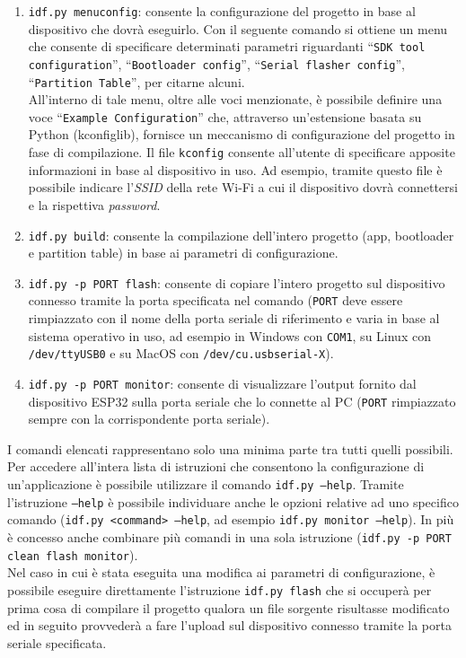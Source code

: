 \begin{enumerate}
    \item \texttt{idf.py menuconfig}: consente la configurazione del progetto in base al dispositivo che dovrà eseguirlo. Con il seguente comando si ottiene un menu che consente di specificare determinati parametri riguardanti ``\texttt{SDK tool configuration}'', ``\texttt{Bootloader config}'', ``\texttt{Serial flasher config}'', ``\texttt{Partition Table}'', per citarne alcuni. \\
    All'interno di tale menu, oltre alle voci menzionate, è possibile definire una voce ``\texttt{Example Configuration}'' che, attraverso un'estensione basata su Python (kconfiglib), fornisce un meccanismo di configurazione del progetto in fase di compilazione. Il file \texttt{kconfig} consente all'utente di specificare apposite informazioni in base al dispositivo in uso. Ad esempio, tramite questo file è possibile indicare l'\textit{SSID} della rete Wi-Fi a cui il dispositivo dovrà connettersi e la rispettiva \textit{password}.
    
    \item \texttt{idf.py build}: consente la compilazione dell'intero progetto (app, bootloader e partition table) in base ai parametri di configurazione. 
    
    \item \texttt{idf.py -p PORT flash}: consente di copiare l'intero progetto sul dispositivo connesso tramite la porta specificata nel comando (\texttt{PORT} deve essere rimpiazzato con il nome della porta seriale di riferimento e varia in base al sistema operativo in uso, ad esempio in Windows con \texttt{COM1}, su Linux con \texttt{/dev/ttyUSB0} e su MacOS con \texttt{/dev/cu.usbserial-X}).
    
    \item \texttt{idf.py -p PORT monitor}: consente di visualizzare l'output fornito dal dispositivo ESP32 sulla porta seriale che lo connette al PC (\texttt{PORT} rimpiazzato sempre con la corrispondente porta seriale).
\end{enumerate}

\noindent I comandi elencati rappresentano solo una minima parte tra tutti quelli possibili. Per accedere all'intera lista di istruzioni che consentono la configurazione di un'applicazione è possibile utilizzare il comando \texttt{idf.py ---help}. Tramite l'istruzione \texttt{--help} è possibile individuare anche le opzioni relative ad uno specifico comando (\texttt{idf.py <command> ---help}, ad esempio \texttt{idf.py monitor ---help}). In più è concesso anche combinare più comandi in una sola istruzione (\texttt{idf.py -p PORT clean flash monitor}).\\
Nel caso in cui è stata eseguita una modifica ai parametri di configurazione, è possibile eseguire direttamente l'istruzione \texttt{idf.py flash} che si occuperà per prima cosa di compilare il progetto qualora un file sorgente risultasse modificato ed in seguito provvederà a fare l'upload sul dispositivo connesso tramite la porta seriale specificata.\\

